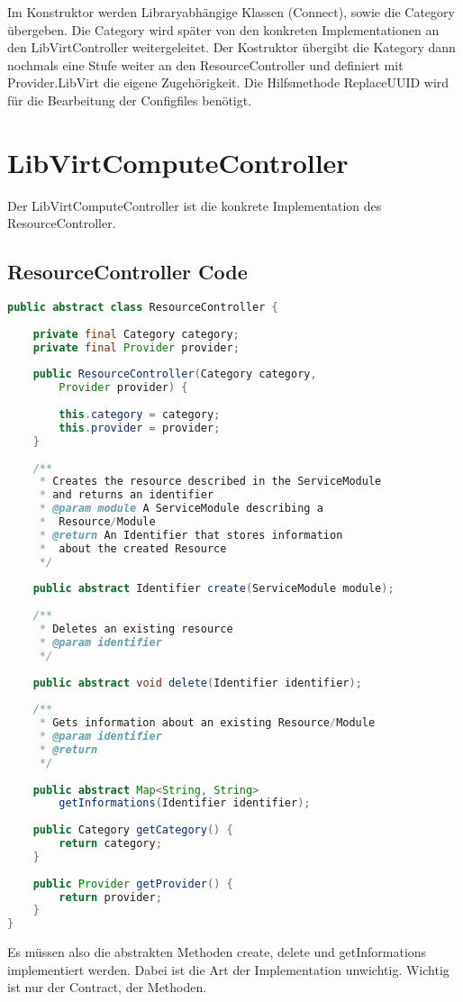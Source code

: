 Im Konstruktor werden Libraryabhängige Klassen (Connect), sowie die Category übergeben. Die Category wird später von den konkreten Implementationen an den LibVirtController weitergeleitet. Der Kostruktor übergibt die Kategory dann nochmals eine Stufe weiter an den ResourceController und definiert mit Provider.LibVirt die eigene Zugehörigkeit.
Die Hilfsmethode ReplaceUUID wird für die Bearbeitung der Configfiles benötigt.

\newpage
\section{LibVirtComputeController}
Der LibVirtComputeController ist die konkrete Implementation des ResourceController.

\subsection{ResourceController Code}
\begin{lstlisting}[language=Java,frame=single] 
public abstract class ResourceController {
	
	private final Category category;
	private final Provider provider;
	
	public ResourceController(Category category, 
		Provider provider) {
		
		this.category = category;
		this.provider = provider;
	}
	
	/**
	 * Creates the resource described in the ServiceModule
	 * and returns an identifier
	 * @param module A ServiceModule describing a 
	 *	Resource/Module
	 * @return An Identifier that stores information 
	 *	about the created Resource
	 */
	
	public abstract Identifier create(ServiceModule module);
	
	/**
	 * Deletes an existing resource
	 * @param identifier 
	 */
	
	public abstract void delete(Identifier identifier);
	
	/**
	 * Gets information about an existing Resource/Module
	 * @param identifier
	 * @return 
	 */
	
	public abstract Map<String, String> 
		getInformations(Identifier identifier);
	
	public Category getCategory() {
		return category;
	}
	
	public Provider getProvider() {
		return provider;
	}
}
\end{lstlisting}
\newline
Es müssen also die abstrakten Methoden create, delete und getInformations implementiert werden. 
Dabei ist die Art der Implementation unwichtig. 
Wichtig ist nur der Contract, der Methoden.

